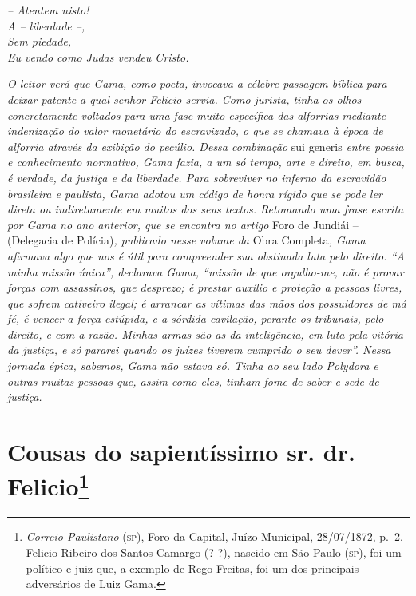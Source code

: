 {\begin{flushright}
\emph{-- Atentem nisto!\\
A -- liberdade --,\\
Sem piedade,\\
Eu vendo como Judas vendeu Cristo.}

\emph{O leitor verá que Gama, como poeta, invocava a célebre passagem
bíblica para deixar patente a qual senhor Felicio servia. Como jurista,
tinha os olhos concretamente voltados para uma fase muito específica das
alforrias mediante indenização do valor monetário do escravizado, o que
se chamava à época de alforria através da exibição do pecúlio. Dessa
combinação} sui generis \emph{entre poesia e conhecimento normativo,
Gama fazia, a um só tempo, arte e direito, em busca, é verdade, da
justiça e da liberdade. Para sobreviver no inferno da escravidão
brasileira e paulista, Gama adotou um código de honra rígido que se pode
ler direta ou indiretamente em muitos dos seus textos. Retomando uma
frase escrita por Gama no ano anterior, que se encontra no artigo} Foro
de Jundiái -- (Delegacia de Polícia)\emph{, publicado nesse volume da}
Obra Completa\emph{, Gama afirmava algo que nos é útil para compreender
sua obstinada luta pelo direito. ``A minha missão única'', declarava Gama,
``missão de que orgulho-me, não é provar forças com assassinos, que
desprezo; é prestar auxílio e proteção a pessoas livres, que sofrem
cativeiro ilegal; é arrancar as vítimas das mãos dos possuidores de má
fé, é vencer a força estúpida, e a sórdida cavilação, perante os
tribunais, pelo direito, e com a razão. Minhas armas são as da
inteligência, em luta pela vitória da justiça, e só pararei quando os
juízes tiverem cumprido o seu dever''. Nessa jornada épica, sabemos, Gama
não estava só. Tinha ao seu lado Polydora e outras muitas pessoas que,
assim como eles, tinham fome de saber e sede de justiça.}

\chapter{Cousas do sapientíssimo sr. dr. Felicio\footnote{
\emph{Correio Paulistano} (\textsc{sp}), Foro da Capital, Juízo
  Municipal, 28/07/1872, p.~2. Felicio Ribeiro dos Santos Camargo (?-?),
  nascido em São Paulo (\textsc{sp}), foi um político e juiz que, a exemplo de
  Rego Freitas, foi um dos principais adversários de Luiz Gama.}} %


\end{flushright}}
